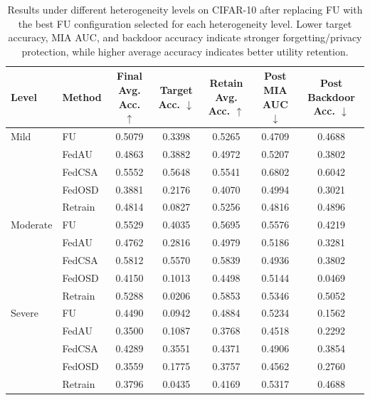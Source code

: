 \begin{table}[t]
\centering
\caption{Results under different heterogeneity levels on CIFAR-10 after replacing FU with the best FU configuration selected for each heterogeneity level. Lower target accuracy, MIA AUC, and backdoor accuracy indicate stronger forgetting/privacy protection, while higher average accuracy indicates better utility retention.}
\label{tab:heterogeneity_results}
\begin{tabular}{llccccc}
\toprule
Level & Method & Final Avg. Acc. $\uparrow$ & Target Acc. $\downarrow$ & Retain Avg. Acc. $\uparrow$ & Post MIA AUC $\downarrow$ & Post Backdoor Acc. $\downarrow$ \\
\midrule
Mild & FU & 0.5079 & 0.3398 & 0.5265 & 0.4709 & 0.4688 \\
 & FedAU & 0.4863 & 0.3882 & 0.4972 & 0.5207 & 0.3802 \\
 & FedCSA & 0.5552 & 0.5648 & 0.5541 & 0.6802 & 0.6042 \\
 & FedOSD & 0.3881 & 0.2176 & 0.4070 & 0.4994 & 0.3021 \\
 & Retrain & 0.4814 & 0.0827 & 0.5256 & 0.4816 & 0.4896 \\
\midrule
Moderate & FU & 0.5529 & 0.4035 & 0.5695 & 0.5576 & 0.4219 \\
 & FedAU & 0.4762 & 0.2816 & 0.4979 & 0.5186 & 0.3281 \\
 & FedCSA & 0.5812 & 0.5570 & 0.5839 & 0.4936 & 0.3802 \\
 & FedOSD & 0.4150 & 0.1013 & 0.4498 & 0.5144 & 0.0469 \\
 & Retrain & 0.5288 & 0.0206 & 0.5853 & 0.5346 & 0.5052 \\
\midrule
Severe & FU & 0.4490 & 0.0942 & 0.4884 & 0.5234 & 0.1562 \\
 & FedAU & 0.3500 & 0.1087 & 0.3768 & 0.4518 & 0.2292 \\
 & FedCSA & 0.4289 & 0.3551 & 0.4371 & 0.4906 & 0.3854 \\
 & FedOSD & 0.3559 & 0.1775 & 0.3757 & 0.4562 & 0.2760 \\
 & Retrain & 0.3796 & 0.0435 & 0.4169 & 0.5317 & 0.4688 \\
\bottomrule
\end{tabular}
\end{table}